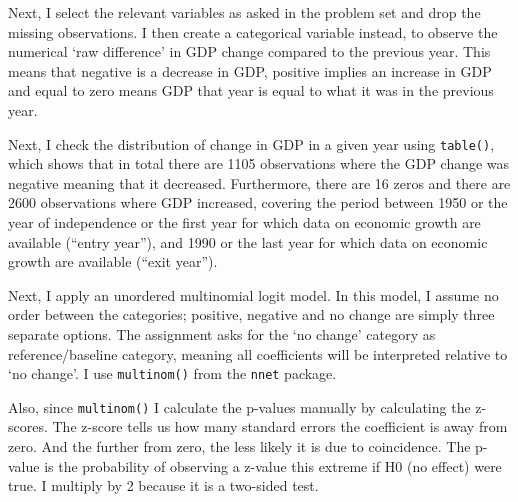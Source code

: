 \documentclass[12pt,letterpaper]{article}
\begin{document}
\begin{enumerate}
\noindent Next,	I select the relevant variables as asked in the problem set and drop the missing observations. I then create a categorical variable instead, to observe the numerical `raw difference' in GDP change compared to the previous year. This means that negative is a decrease in GDP, positive implies an increase in GDP and equal to zero means GDP that year is equal to what it was in the previous year. \newline

\noindent Next, I check the distribution of change in GDP in a given year using \texttt{table()}, which shows that in total there are 1105 observations where the GDP change was negative meaning that it decreased. Furthermore, there are 16 zeros and there are 2600 observations where GDP increased, covering the period between 1950 or the year of independence or the first year for which data on economic growth are available (``entry year''), and 1990 or the last year for which data on economic growth are available (``exit year'').\newline
	
	\noindent Next, I apply an unordered multinomial logit model. In this model, I assume no order between the categories; positive, negative and no change are simply three separate options. The assignment asks for the `no change' category as reference/baseline category, meaning all coefficients will be interpreted relative to `no change'. I use \texttt{multinom()} from the \texttt{nnet} package.\newline
	
	\noindent Also, since \texttt{multinom()} I calculate the p-values manually by calculating the z-scores. The z-score tells us how many standard errors the coefficient is away from zero. And the further from zero, the less likely it is due to coincidence. The p-value is the probability of observing a z-value this extreme if H0 (no effect) were true. I multiply by 2 because it is a two-sided test.\newline


\end{enumerate}
\end{document}
